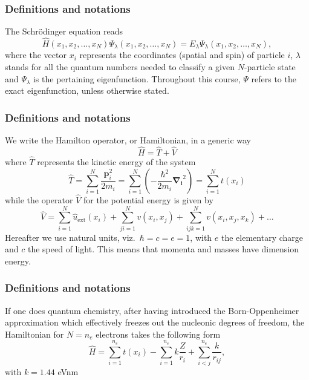 \documentclass[compress]{beamer}
\begin{document}
\frame
{
  \frametitle{Definitions and notations}
\begin{small}
{\scriptsize
The Schr\"odinger equation reads 
\begin{equation}
\hat{H}(x_1, x_2, \dots , x_N) \Psi_{\lambda}(x_1, x_2, \dots , x_N) = 
E_\lambda  \Psi_\lambda(x_1, x_2, \dots , x_N), 
\label{eq:basicSE1}
\end{equation}
where the vector $x_i$ represents the coordinates (spatial and spin) of particle $i$, $\lambda$ stands  for all the quantum
numbers needed to classify a given $N$-particle state and $\Psi_{\lambda}$ is the pertaining eigenfunction.  Throughout this course,
$\Psi$ refers to the exact eigenfunction, unless otherwise stated.
}
\end{small}
}

\frame
{
  \frametitle{Definitions and notations}
\begin{small}
{\scriptsize
We write the Hamilton operator, or Hamiltonian,  in a generic way 
\[
	\hat{H} = \hat{T} + \hat{V} 
\]
where $\hat{T}$  represents the kinetic energy of the system
\[
	\hat{T} = \sum_{i=1}^N \frac{\mathbf{p}_i^2}{2m_i} = \sum_{i=1}^N \left( -\frac{\hbar^2}{2m_i} \mathbf{\nabla_i}^2 \right) =
		\sum_{i=1}^N t(x_i)
\]
while the operator $\hat{V}$ for the potential energy is given by
\begin{equation}
	\hat{V} = \sum_{i=1}^N \hat{u}_{\mathrm{ext}}(x_i) + \sum_{ji=1}^N v(x_i,x_j)+\sum_{ijk=1}^Nv(x_i,x_j,x_k)+\dots
\label{eq:firstv}
\end{equation}
Hereafter we use natural units, viz.~$\hbar=c=e=1$, with $e$ the elementary charge and $c$ the speed of light. This means that momenta and masses
have dimension energy. 
}
\end{small}
}
\frame
{
  \frametitle{Definitions and notations}
\begin{small}
{\scriptsize
If one does quantum chemistry, after having introduced the  Born-Oppenheimer approximation which effectively freezes out the nucleonic degrees
of freedom, the Hamiltonian for $N=n_e$ electrons takes the following form 
\[
  \hat{H} = \sum_{i=1}^{n_e} t(x_i) 
  - \sum_{i=1}^{n_e} k\frac{Z}{r_i} + \sum_{i<j}^{n_e} \frac{k}{r_{ij}},
\]
with $k=1.44$ eVnm
}
\end{small}
}
\end{document}
